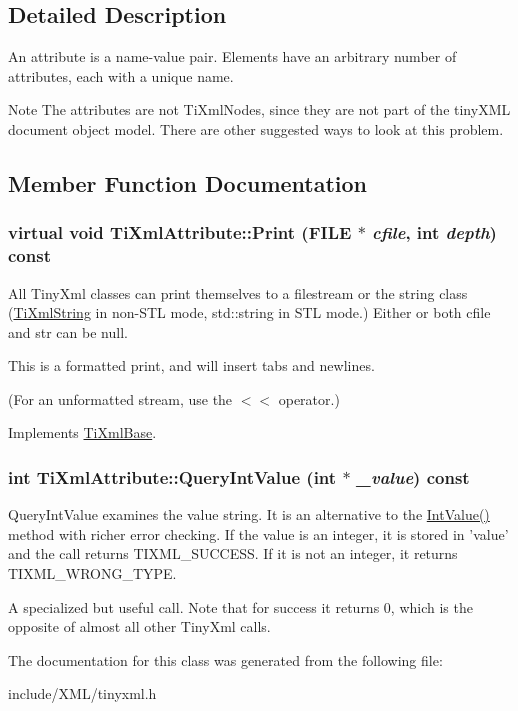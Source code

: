 \subsection{Detailed Description}
An attribute is a name-\/value pair. Elements have an arbitrary number of attributes, each with a unique name.

\begin{DoxyNote}{Note}
The attributes are not TiXmlNodes, since they are not part of the tinyXML document object model. There are other suggested ways to look at this problem. 
\end{DoxyNote}


\subsection{Member Function Documentation}
\hypertarget{class_ti_xml_attribute_acc04956c1d5c4c31fe74f7a7528d109a}{
\subsubsection[{Print}]{\setlength{\rightskip}{0pt plus 5cm}virtual void TiXmlAttribute::Print (FILE $\ast$ {\em cfile}, \/  int {\em depth}) const}}
\label{class_ti_xml_attribute_acc04956c1d5c4c31fe74f7a7528d109a}
All TinyXml classes can print themselves to a filestream or the string class (\hyperlink{class_ti_xml_string}{TiXmlString} in non-\/STL mode, std::string in STL mode.) Either or both cfile and str can be null.

This is a formatted print, and will insert tabs and newlines.

(For an unformatted stream, use the $<$$<$ operator.) 

Implements \hyperlink{class_ti_xml_base_a0de56b3f2ef14c65091a3b916437b512}{TiXmlBase}.\hypertarget{class_ti_xml_attribute_ad6c93088ee21af41a107931223339344}{
\subsubsection[{QueryIntValue}]{\setlength{\rightskip}{0pt plus 5cm}int TiXmlAttribute::QueryIntValue (int $\ast$ {\em \_\-value}) const}}
\label{class_ti_xml_attribute_ad6c93088ee21af41a107931223339344}
QueryIntValue examines the value string. It is an alternative to the \hyperlink{class_ti_xml_attribute_aa1a20ad59dc7e89a0ab265396360d50f}{IntValue()} method with richer error checking. If the value is an integer, it is stored in 'value' and the call returns TIXML\_\-SUCCESS. If it is not an integer, it returns TIXML\_\-WRONG\_\-TYPE.

A specialized but useful call. Note that for success it returns 0, which is the opposite of almost all other TinyXml calls. 

The documentation for this class was generated from the following file:\begin{DoxyCompactItemize}
\item 
include/XML/tinyxml.h\end{DoxyCompactItemize}
